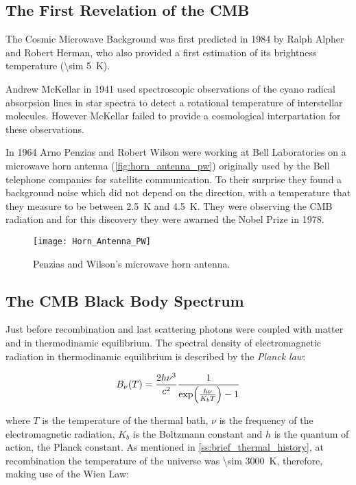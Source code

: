 \subsection{The First Revelation of the CMB}

The Cosmic Microwave Background was first predicted in 1984 by Ralph Alpher
and Robert Herman, who also provided a first estimation of its brightness
temperature (\SI{\sim 5}{\kelvin}).

Andrew McKellar in 1941 used spectroscopic observations of the cyano radical
absorpsion lines in star spectra to detect a rotational temperature of
interstellar molecules. However McKellar failed to provide a cosmological
interpartation for these observations. 

In 1964 Arno Penzias and Robert Wilson were working at Bell Laboratories
on a microwave horn antenna (\autoref{fig:horn_antenna_pw}) originally used by
the Bell telephone companies for satellite communication.
To their surprise they found a background noise which did not depend on the
direction, with a temperature that they measure to be between
\SI{2.5}{\kelvin} and \SI{4.5}{\kelvin}. They were observing the CMB
radiation and for this discovery they were awarned the Nobel Prize in 1978.

\begin{figure}
        \centering
        \texttt{[image: Horn\_Antenna\_PW]}
        \caption{Penzias and Wilson's microwave horn antenna.}
        \label{fig:horn_antenna_pw}
\end{figure}

\subsection{The CMB Black Body Spectrum}

Just before recombination and last scattering photons were
coupled with matter and in thermodinamic equilibrium. The spectral density
of electromagnetic radiation in thermodinamic equilibrium is described by
the \emph{Planck law}:

\begin{equation}
        B_\nu\qty(T) = \frac{2h\nu^3}{c^2}
        \frac{1}{\exp(\frac{h\nu}{K_b T}) - 1}
\end{equation}

where $T$ is the temperature of the thermal bath, $\nu$ is the frequency of
the electromagnetic radiation, $K_b$ is the Boltzmann constant and $h$ is
the quantum of action, the Planck constant. As mentioned in
\autoref{ss:brief_thermal_history}, at recombination the temperature of the
universe was \SI{\sim 3000}{\kelvin}, therefore, making use of the Wien
Law:

